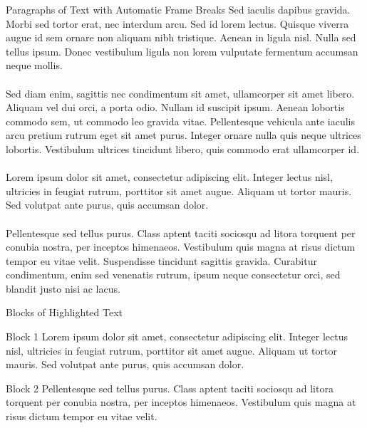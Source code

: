 \documentclass[aspectratio=169]{beamer}
\begin{document}
\begin{frame}[allowframebreaks]{Paragraphs of Text with Automatic Frame Breaks} %
  Sed iaculis dapibus gravida. Morbi sed tortor erat, nec interdum arcu. Sed id lorem lectus. Quisque viverra augue id sem ornare non aliquam nibh tristique. Aenean in ligula nisl. Nulla sed tellus ipsum. Donec vestibulum ligula non lorem vulputate fermentum accumsan neque mollis.\\~\\
  Sed diam enim, sagittis nec condimentum sit amet, ullamcorper sit amet libero. Aliquam vel dui orci, a porta odio. Nullam id suscipit ipsum. Aenean lobortis commodo sem, ut commodo leo gravida vitae. Pellentesque vehicula ante iaculis arcu pretium rutrum eget sit amet purus. Integer ornare nulla quis neque ultrices lobortis. Vestibulum ultrices tincidunt libero, quis commodo erat ullamcorper id. \\~\\
  Lorem ipsum dolor sit amet, consectetur adipiscing elit. Integer lectus nisl, ultricies in feugiat rutrum, porttitor sit amet augue. Aliquam ut tortor mauris. Sed volutpat ante purus, quis accumsan dolor.\\~\\
  Pellentesque sed tellus purus. Class aptent taciti sociosqu ad litora torquent per conubia nostra, per inceptos himenaeos. Vestibulum quis magna at risus dictum tempor eu vitae velit. Suspendisse tincidunt sagittis gravida. Curabitur condimentum, enim sed venenatis rutrum, ipsum neque consectetur orci, sed blandit justo nisi ac lacus.
\end{frame}  

\begin{frame}{Blocks of Highlighted Text}
  \begin{block}{Block 1}
    Lorem ipsum dolor sit amet, consectetur adipiscing elit. Integer lectus nisl, ultricies in feugiat rutrum, porttitor sit amet augue. Aliquam ut tortor mauris. Sed volutpat ante purus, quis accumsan dolor.
  \end{block}
  \begin{block}{Block 2}
    Pellentesque sed tellus purus. Class aptent taciti sociosqu ad litora torquent per conubia nostra, per inceptos himenaeos. Vestibulum quis magna at risus dictum tempor eu vitae velit.
  \end{block}
\end{frame}
  
\end{document}
